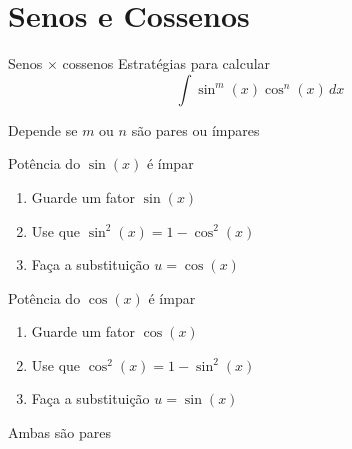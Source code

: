 \section{Senos e Cossenos}

\begin{frame}{Senos $\times$ cossenos}
  Estratégias para calcular
  \[
    \int \sin^m(x) \cos^n(x)\,dx
  \]

  Depende se $m$ ou $n$ são pares ou ímpares
\end{frame}

\begin{frame}{Potência do $\sin(x)$ é ímpar}
  \begin{enumerate}[<+->]
    \setlength\itemsep{1em}
    \item Guarde um fator $\sin(x)$
    \item Use que $\sin^2(x) = 1 - \cos^2(x)$
    \item Faça a substituição $u=\cos(x)$
  \end{enumerate}
\end{frame}

\begin{frame}{Potência do $\cos(x)$ é ímpar}
  \begin{enumerate}[<+->]
    \setlength\itemsep{1em}
    \item Guarde um fator $\cos(x)$
    \item Use que $\cos^2(x) = 1 - \sin^2(x)$
    \item Faça a substituição $u=\sin(x)$
  \end{enumerate}
\end{frame}

\begin{frame}{Ambas são pares}


\end{frame}

